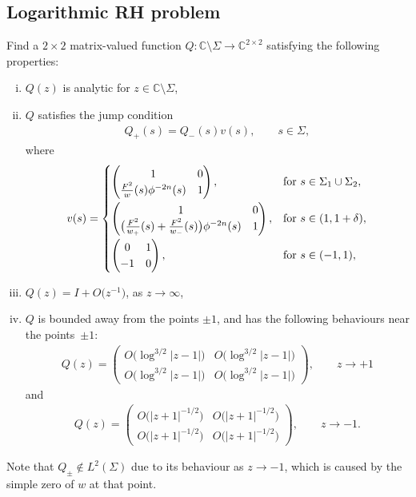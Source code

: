 \documentclass[11pt]{article}
\numberwithin{equation}{section}
\newcommand{\C}{\mathbb{C}}
\newcommand{\Id}{I}
\newcommand{\bQ}{ Q}
\newcommand{\bv}{v}
\numberwithin{equation}{section}
\begin{document}
\subsection{Logarithmic RH problem}\label{logRHP} Find a $2\times2$ matrix-valued function $\bQ \colon \C \setminus \Sigma \to \C^{2\times2}$ satisfying the following properties:
\begin{enumerate}[(i)]\itemsep=0pt
 \item $\bQ(z)$ is analytic for $z \in \C \setminus \Sigma$,
 \item $\bQ$ satisfies the jump condition
 \begin{align*}
 \bQ_+(s) = \bQ_-(s) \bv(s), \qquad s\in \Sigma,
 \end{align*}
 where
 \begin{align} \label{jumpMatrixV}
\bv(s) =
\begin{cases}
\begin{pmatrix}
1 & 0
\\
\frac{F^2}{w}(s) \phi^{-2n}(s) & 1
\end{pmatrix}, & \mbox{for} \ s \in \Sigma_1 \cup \Sigma_2,\vspace{1mm}
\\
\begin{pmatrix}
1 & 0
\\
\big(\frac{F^2}{w_+}(s)+\frac{F^2}{w_-}(s)\big) \phi^{-2n}(s) & 1
\end{pmatrix}, & \mbox{for}\  s\in(1,1+\delta),\vspace{1mm}
\\
\begin{pmatrix}
0 & 1
\\
-1 & 0
\end{pmatrix}, & \mbox{for}\ s \in (-1,1),
\end{cases}
\end{align}
\item $\bQ(z) = \Id + O\big(z^{-1}\big)$, as $z \rightarrow \infty$,
\item $\bQ$ is bounded away from the points $\pm 1$, and has the following behaviours near the points~$\pm1$:
\begin{align*}
 Q(z) = \begin{pmatrix}
 O\big(\log^{3/2}|z-1|\big) & O\big(\log^{3/2}|z-1|\big)
 \\
 O\big(\log^{3/2}|z-1|\big) & O\big(\log^{3/2}|z-1|\big)
 \end{pmatrix}, \qquad z\to +1
\end{align*}
and
\begin{align*}
 Q(z) = \begin{pmatrix}
 O\big(|z+1|^{-1/2}\big) & O\big(|z+1|^{-1/2}\big)
 \\
 O\big(|z+1|^{-1/2}\big) & O\big(|z+1|^{-1/2}\big)
 \end{pmatrix}, \qquad z \to -1.
\end{align*}
\end{enumerate}
Note that $\bQ_\pm \not \in L^2(\Sigma)$ due to its behaviour as $z\to -1$, which is caused by the simple zero of $w$ at that point.
\end{document}
